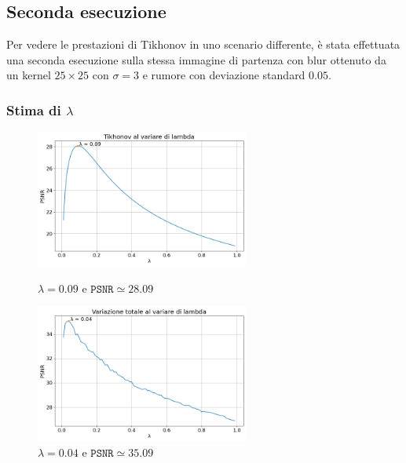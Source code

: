 \documentclass[11pt]{article}
\begin{document}
\subsection{Seconda esecuzione}
Per vedere le prestazioni di Tikhonov in uno scenario differente, è stata effettuata una seconda esecuzione sulla stessa immagine di partenza con blur ottenuto da un kernel $25 \times 25$ con $\sigma=3$ e rumore con deviazione standard $0.05$.

\subsubsection{Stima di $\lambda$}
\begin{figure}[H]
    \centering
    \begin{minipage}{0.45\textwidth}
        \centering
        \includegraphics[width=7cm]{esecuzione/2/tikhonov_lambda.png}
        \caption{$\lambda=0.09$ e $\texttt{PSNR} \simeq 28.09$}
        \label{fig:tikhonov_lambda2}
    \end{minipage}\hfill
    \begin{minipage}{0.45\textwidth}
        \centering
        \includegraphics[width=7cm]{esecuzione/2/tv_lambda.png}
        \caption{$\lambda=0.04$ e $\texttt{PSNR} \simeq 35.09$}
        \label{fig:tv_lambda2}
    \end{minipage}
\end{figure}
\end{document}
